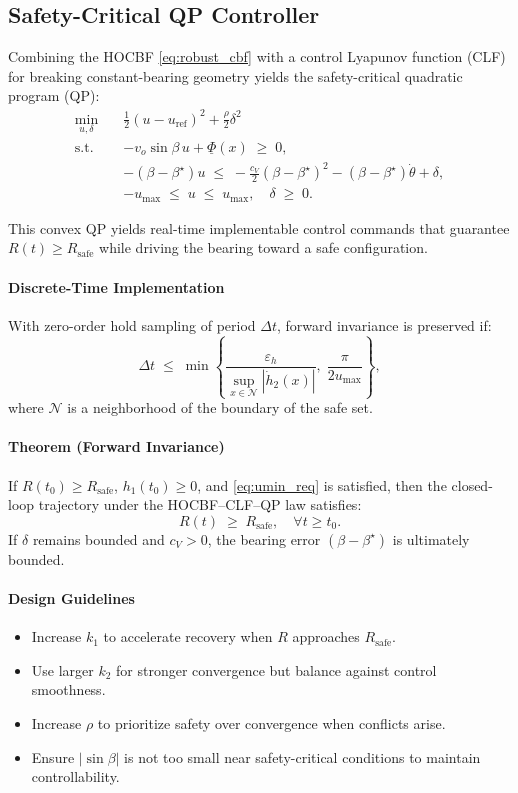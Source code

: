 \documentclass[11pt,a4paper]{article}
\numberwithin{equation}{section}
\begin{document}
\subsection{Safety-Critical QP Controller}
\label{sec:cbf_clf_qp}

Combining the HOCBF \eqref{eq:robust_cbf} with a control Lyapunov function (CLF) for breaking constant-bearing geometry yields the safety-critical quadratic program (QP):
\begin{align}
    \min_{u, \delta} \quad & \tfrac{1}{2} (u - u_{\mathrm{ref}})^2 + \tfrac{\rho}{2} \delta^2 \\
    \text{s.t.} \quad 
    & - v_o \sin\beta \, u + \underline{\Phi}(x) \;\ge\; 0, \\
    & -(\beta - \beta^\star) u \;\le\; 
      - \tfrac{c_V}{2} (\beta - \beta^\star)^2 
      - (\beta - \beta^\star)\dot\theta + \delta, \\
    & -u_{\max} \;\le\; u \;\le\; u_{\max}, 
      \quad \delta \;\ge\; 0.
\end{align}

This convex QP yields real-time implementable control commands that guarantee $R(t) \ge R_{\mathrm{safe}}$ while driving the bearing toward a safe configuration.

\paragraph*{Discrete-Time Implementation}
With zero-order hold sampling of period $\Delta t$, forward invariance is preserved if:
\begin{equation}
    \Delta t
    \;\le\;
    \min
    \left\{
        \frac{\varepsilon_h}{\sup_{x\in \mathcal{N}} |\dot h_2(x)|},
        \; \frac{\pi}{2 u_{\max}}
    \right\},
\end{equation}
where $\mathcal{N}$ is a neighborhood of the boundary of the safe set.

\paragraph*{Theorem (Forward Invariance)}
If $R(t_0) \ge R_{\mathrm{safe}}$, $h_1(t_0) \ge 0$, and \eqref{eq:umin_req} is satisfied, then the closed-loop trajectory under the HOCBF–CLF–QP law satisfies:
\[
R(t) \;\ge\; R_{\mathrm{safe}}, 
\quad \forall t \ge t_0.
\]
If $\delta$ remains bounded and $c_V > 0$, the bearing error $(\beta - \beta^\star)$ is ultimately bounded.

\paragraph*{Design Guidelines}
\begin{itemize}
    \item Increase $k_1$ to accelerate recovery when $R$ approaches $R_{\mathrm{safe}}$.
    \item Use larger $k_2$ for stronger convergence but balance against control smoothness.
    \item Increase $\rho$ to prioritize safety over convergence when conflicts arise.
    \item Ensure $|\sin\beta|$ is not too small near safety-critical conditions to maintain controllability.
\end{itemize}
\end{document}
